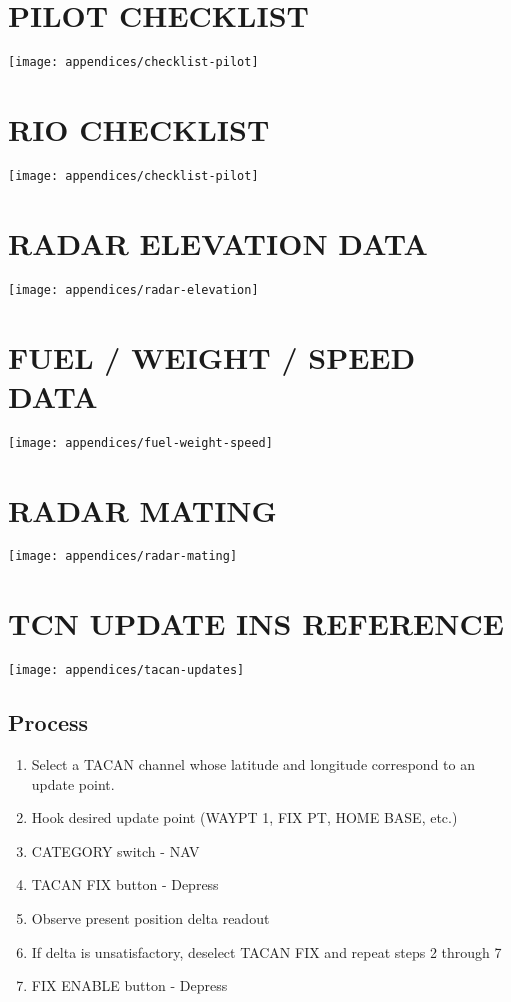 
\section{PILOT CHECKLIST}

\texttt{[image: appendices/checklist-pilot]}

\section{RIO CHECKLIST}

\texttt{[image: appendices/checklist-pilot]}

\section{RADAR ELEVATION DATA}

\texttt{[image: appendices/radar-elevation]}

\section{FUEL / WEIGHT / SPEED DATA}

\texttt{[image: appendices/fuel-weight-speed]}

\section{RADAR MATING}
\label{sec:radar-mating}

\texttt{[image: appendices/radar-mating]}

\section{TCN UPDATE INS REFERENCE}

\texttt{[image: appendices/tacan-updates]}

\subsection*{Process}

\begin{enumerate}
  \item Select a TACAN channel whose latitude and longitude correspond to an
    update point.

  \item Hook desired update point (WAYPT 1, FIX PT, HOME BASE, etc.)

  \item CATEGORY switch - NAV

  \item TACAN FIX button - Depress

  \item Observe present position delta readout

  \item If delta is unsatisfactory, deselect TACAN FIX and repeat steps 2
    through 7

  \item FIX ENABLE button - Depress
\end{enumerate}
